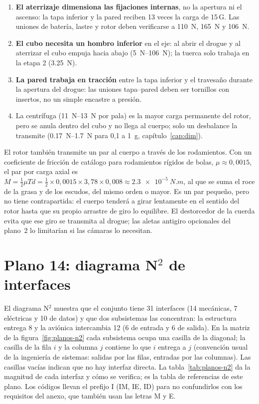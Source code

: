 \begin{resultado}
\begin{enumerate}[leftmargin=*]
  \item \textbf{El aterrizaje dimensiona las fijaciones internas}, no la apertura ni el
        ascenso: la tapa inferior y la pared reciben 13 veces la carga de 15\,G. Las
        uniones de batería, lastre y rotor deben verificarse a \SI{110}{N},
        \SI{165}{N} y \SI{106}{N}.
  \item \textbf{El cubo necesita un hombro inferior} en el eje: al abrir el drogue y al
        aterrizar el cubo empuja hacia abajo (\SIrange{5}{106}{N}); la tuerca solo trabaja
        en la etapa 2 (\SI{3.25}{N}).
  \item \textbf{La pared trabaja en tracción} entre la tapa inferior y el travesaño durante
        la apertura del drogue: las uniones tapa--pared deben ser tornillos con insertos,
        no un simple encastre a presión.
  \item La centrífuga (\SIrange{11}{13}{N} por pala) es la mayor carga permanente del rotor, pero se
        anula dentro del cubo y no llega al cuerpo; solo un desbalance la transmite
        (\SIrange{0.17}{1.7}{N} para 0,1 a \SI{1}{g}, capítulo~\ref{cap:dim}).
\end{enumerate}
\end{resultado}

El rotor también transmite un par al cuerpo a través de los rodamientos. Con un
coeficiente de fricción de catálogo para rodamientos rígidos de bolas,
$\mu\approx0{,}0015$, el par por carga axial es
$M=\tfrac12\mu T d=\tfrac12\times0{,}0015\times3{,}78\times0{,}008\approx\SI{2.3e-5}{N.m}$,
al que se suma el roce de la grasa y de los escudos, del mismo orden o mayor. Es un par
pequeño, pero no tiene contrapartida: el cuerpo tenderá a girar lentamente en el sentido
del rotor hasta que su propio arrastre de giro lo equilibre. El destorcedor de la cuerda
evita que ese giro se transmita al drogue; las aletas antigiro opcionales del plano~2 lo
limitarían si las cámaras lo necesitan.

\section{Plano 14: diagrama N$^2$ de interfaces}\label{sec:planos-n2}

El diagrama N$^2$ muestra que el conjunto tiene 31 interfaces (14 mecánicas, 7 eléctricas y
10 de datos) y que dos subsistemas las concentran: la estructura entrega 8 y la aviónica
intercambia 12 (6 de entrada y 6 de salida). En la matriz de la figura~\ref{fig:planos-n2} cada subsistema ocupa una casilla de
la diagonal; la casilla de la fila $i$ y la columna $j$ contiene lo que $i$ entrega a $j$
(convención usual de la ingeniería de sistemas: salidas por las filas, entradas por las
columnas). Las casillas vacías indican que no hay interfaz directa. La
tabla~\ref{tab:planos-n2} da la magnitud de cada interfaz y cómo se verifica; es la tabla
de referencias de este plano. Los códigos llevan el prefijo I (IM, IE, ID) para no
confundirlos con los requisitos del anexo, que también usan las letras M y E.

